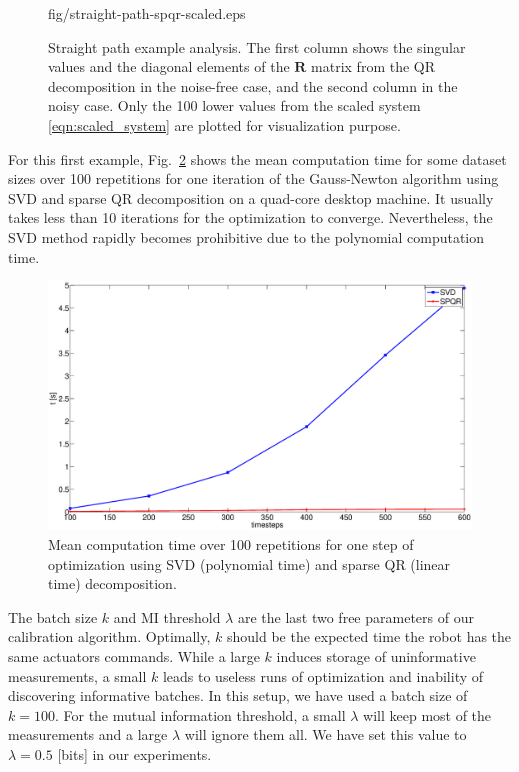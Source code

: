 \begin{figure}[t]
\begin{minipage}{.492\columnwidth}
    {fig/straight-path-spqr-scaled.eps}
\end{minipage}
\caption{Straight path example analysis. The first column shows the singular
  values and the diagonal elements of the $\mathbf{R}$ matrix from the QR
  decomposition in the noise-free case, and the second column in the noisy
  case. Only the 100 lower values from the scaled system
  \eqref{eqn:scaled_system} are plotted for visualization purpose.}
\label{fig:straight-path-analysis}
\end{figure}

For this first example, Fig.~\ref{fig:straight-path-time} shows the mean
computation time for some dataset sizes over 100 repetitions for one iteration
of the Gauss-Newton algorithm using SVD and sparse QR decomposition on a
quad-core desktop machine. It usually takes less than 10 iterations for the
optimization to converge. Nevertheless, the SVD method rapidly becomes
prohibitive due to the polynomial computation time.

\begin{figure}[t]
\centering
\includegraphics[width=\columnwidth]{fig/straight-path-time.eps}
\caption{Mean computation time over 100 repetitions for one step of
  optimization using SVD (polynomial time) and sparse QR (linear time)
  decomposition.}
\label{fig:straight-path-time}
\end{figure}

The batch size $k$ and MI threshold $\lambda$ are the last two
free parameters of our calibration algorithm. Optimally, $k$ should be the
expected time the robot has the same actuators commands. While a large $k$
induces storage of uninformative measurements, a small $k$ leads to useless
runs of optimization and inability of discovering informative batches. In this
setup, we have used a batch size of $k=100$. For the mutual information
threshold, a small $\lambda$ will keep most of the measurements and a large
$\lambda$ will ignore them all. We have set this value to
$\lambda=0.5$ [bits] in our experiments.

